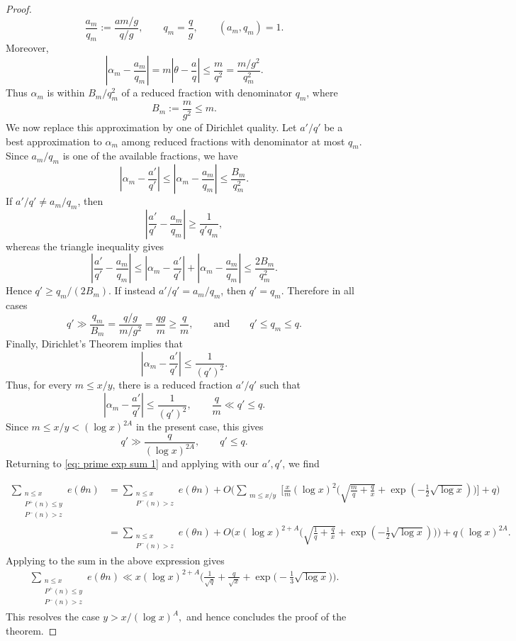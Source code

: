 \documentclass[12pt]{amsart}
\renewcommand{\le}{\leqslant}
\renewcommand{\leq}{\leqslant}
\renewcommand{\ge}{\geqslant}
\renewcommand{\geq}{\geqslant}
\numberwithin{equation}{section}
\theoremstyle{plain}
\theoremstyle{definition}
\begin{document}
\begin{proof}
		$$
		\frac{a_m}{q_m}:=\frac{am/g}{q/g},
		\qquad q_m=\frac{q}{g},
		\qquad (a_m,q_m)=1.
		$$
		Moreover,
		$$
		\left|\alpha_m-\frac{a_m}{q_m}\right|
		=
		m\left|\theta-\frac aq\right|
		\leq \frac{m}{q^2}
		=
		\frac{m/g^2}{q_m^2}.
		$$
		Thus $\alpha_m$ is within $B_m/q_m^2$ of a reduced fraction with
		denominator $q_m$, where
		$$
		B_m:=\frac{m}{g^2}\le m.
		$$
		We now replace this approximation by one of Dirichlet quality. Let
		$a'/q'$ be a best approximation to $\alpha_m$ among reduced fractions
		with denominator at most $q_m$. Since $a_m/q_m$ is one of the available
		fractions, we have
		$$
		\left|\alpha_m-\frac{a'}{q'}\right|
		\leq
		\left|\alpha_m-\frac{a_m}{q_m}\right|
		\leq
		\frac{B_m}{q_m^2}.
		$$
		If $a'/q'\ne a_m/q_m$, then
		$$
		\left|\frac{a'}{q'}-\frac{a_m}{q_m}\right|
		\geq \frac{1}{q'q_m},
		$$
		whereas the triangle inequality gives
		$$
		\left|\frac{a'}{q'}-\frac{a_m}{q_m}\right|
		\leq
		\left|\alpha_m-\frac{a'}{q'}\right|
		+
		\left|\alpha_m-\frac{a_m}{q_m}\right|
		\leq \frac{2B_m}{q_m^2}.
		$$
		Hence $q'\ge q_m/(2B_m)$. If instead $a'/q'=a_m/q_m$, then $q'=q_m$.
		Therefore in all cases
		$$
		q'\gg \frac{q_m}{B_m}
		=
		\frac{q/g}{m/g^2}
		=
		\frac{qg}{m}
		\geq \frac{q}{m},
		\qquad\text{and}\qquad
		q'\le q_m\le q.
		$$
		Finally, Dirichlet's Theorem implies that
		$$
		\left|\alpha_m-\frac{a'}{q'}\right|
		\le \frac{1}{(q')^2}.
		$$
		Thus, for every $m\le x/y$, there is a reduced fraction $a'/q'$ such
		that
		$$
		\left|\alpha_m-\frac{a'}{q'}\right|\le \frac{1}{(q')^2},
		\qquad
		\frac{q}{m}\ll q'\le q.
		$$
		Since $m\le x/y<(\log x)^{2A}$ in the present case, this gives
		$$
		q'\gg \frac{q}{(\log x)^{2A}},
		\qquad q'\le q.
		$$
		Returning to \eqref{eq: prime exp sum 1} and applying  with our $a',q'$, we find
		
		
		
		\begin{align} \nonumber
			\sum_{\substack{n \leq x \\ P^+(n) \leq y \\ P^-(n) > z}}e(\theta n) &=\sum_{\substack{n \leq x \\  P^-(n) > z}} e(\theta n) +  O\bigg(\sum_{\substack{m \leq x/y}} \bigg[\frac{x}{m} (\log x)^{2} \bigg(\sqrt{\frac{m}{q}+\frac{q}{x}} +\exp(-\frac{1}{2}\sqrt{\log x})\bigg)\bigg] +q \bigg) \\
			&= \sum_{\substack{n \leq x \\  P^-(n) > z}} e(\theta n) +O\bigg(x (\log x)^{2+A} \bigg(\sqrt{\frac{1}{q}+\frac{q}{x}} +\exp(-\frac{1}{2}\sqrt{\log x})\bigg) \bigg) + q (\log x)^{2A}. \label{eq: prime exp sum 2}
		\end{align}
		Applying  to the sum in the above expression gives
		\begin{align} 	\sum_{\substack{n \leq x \\ P^+(n) \leq y \\ P^-(n) > z}}e(\theta n) \ll x (\log x)^{2+A} \bigg(\frac{1}{\sqrt{q}} +\frac{q}{\sqrt{x}} +\exp\bigg(-\frac{1}{3}\sqrt{\log x}\bigg)\bigg) .
		\end{align}
		This resolves the case $y > x/(\log x)^A,$ and hence concludes the proof of the theorem.
	\end{proof}
	
\end{document}
